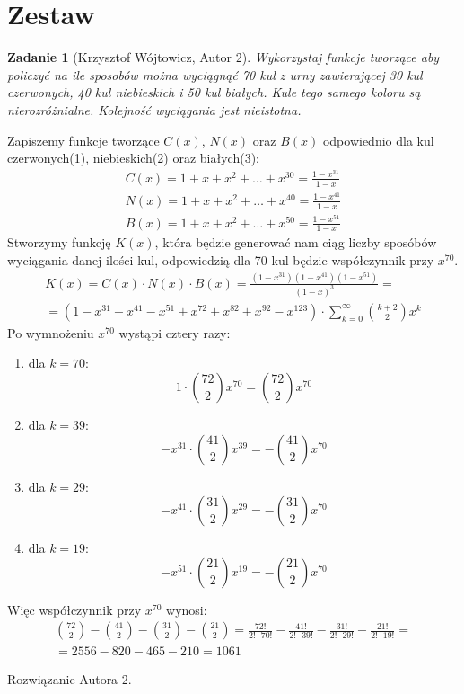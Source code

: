 \documentclass{mwart}
\newtheorem{zad}{Zadanie}[section]
\begin{document}
\newpage
\section{Zestaw}          %

\begin{zad}[Krzysztof Wójtowicz, Autor 2]
    Wykorzystaj funkcje tworzące aby policzyć na ile sposobów można wyciągnąć 70 kul z urny zawierającej 30 kul czerwonych, 40 kul niebieskich i 50 kul białych. Kule tego samego koloru są nierozróżnialne. Kolejność wyciągania jest nieistotna.
\end{zad}
\begin{mdframed}
    Zapiszemy funkcje tworzące $C(x)$, $N(x)$ oraz $B(x)$ odpowiednio dla kul czerwonych(1), niebieskich(2) oraz białych(3):
    \begin{align}
        C(x) = 1 + x + x^2 + \dots + x^{30} = \frac{1 - x^{31}}{1 - x} \\
        N(x) = 1 + x + x^2 + \dots + x^{40} = \frac{1 - x^{41}}{1 - x} \\
        B(x) = 1 + x + x^2 + \dots + x^{50} = \frac{1 - x^{51}}{1 - x}
    \end{align}
    Stworzymy funkcję $K(x)$, która będzie generować nam ciąg liczby sposóbów wyciągania danej ilości kul, odpowiedzią dla 70 kul będzie współczynnik przy $x^{70}$.
    \begin{gather*}
        K(x) = C(x) \cdot N(x) \cdot B(x) = \frac{(1 - x^{31})(1 - x^{41})(1 - x^{51})}{(1 - x)^3} = \\
        = (1 - x^{31} - x^{41} - x^{51} + x^{72} + x^{82} + x^{92} - x^{123}) \cdot \sum_{k=0}^{\infty} \binom{k+2}{2}x^k
    \end{gather*}
    Po wymnożeniu $x^{70}$ wystąpi cztery razy:
    \begin{enumerate}
        \item dla $k = 70$: \[ 1 \cdot \binom{72}{2}x^{70} = \binom{72}{2}x^{70}\]
        \item dla $k = 39$: \[ -x^{31} \cdot \binom{41}{2}x^{39} = -\binom{41}{2}x^{70}\]
        \item dla $k = 29$: \[ -x^{41} \cdot \binom{31}{2}x^{29} = -\binom{31}{2}x^{70}\]
        \item dla $k = 19$: \[ -x^{51} \cdot \binom{21}{2}x^{19} = -\binom{21}{2}x^{70}\]
    \end{enumerate}
    Więc współczynnik przy $x^{70}$ wynosi:
    \begin{gather*}
        \binom{72}{2} - \binom{41}{2} - \binom{31}{2} - \binom{21}{2} = \frac{72!}{2! \cdot 70!} - \frac{41!}{2! \cdot 39!} - \frac{31!}{2! \cdot 29!} - \frac{21!}{2! \cdot 19!} = \\ = 2556 - 820 - 465 - 210 = 1061
    \end{gather*}

\end{mdframed}
\begin{mdframed}
    Rozwiązanie Autora 2.
\end{mdframed}
\end{document}
